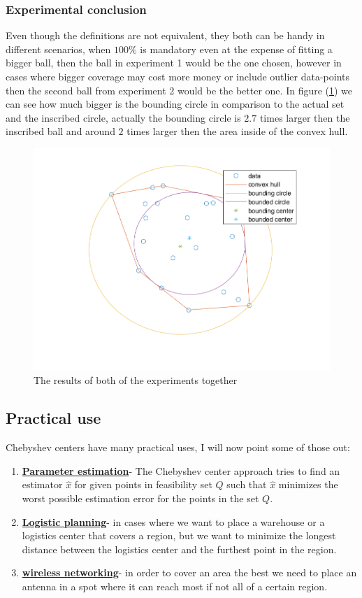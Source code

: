 \documentclass[]{article}
\newcommand{\Q}[0]{\textit{Q}}
\begin{document}
\subsubsection{Experimental conclusion}
Even though the definitions are not equivalent, they both can be handy in different scenarios, when $100\%$ is mandatory even at the expense of fitting a bigger ball, then the ball in experiment 1 would be the one chosen, however in cases where bigger coverage may cost more money or include outlier data-points then the second ball from experiment 2 would be the better one.
In figure (\ref{both}) we can see how much bigger is the bounding circle in comparison to the actual set and the inscribed circle, actually the bounding circle is $2.7$ times larger then the inscribed ball and around $2$ times larger then the area inside of the convex hull.

\begin{figure}[!h]
	\centering
	\includegraphics[width=\textwidth]{both}
	\caption{The results of both of the experiments together}
	\label{both}
\end{figure}

\subsection{Practical use}

Chebyshev centers have many practical uses, I will now point some of those out:
\begin{enumerate}
	\item \underline{\textbf{Parameter estimation}}- The Chebyshev center approach tries to find an estimator $\hat{x}$ for given points in feasibility set $\Q$ such that $\hat{x}$ minimizes the worst possible estimation error for the points in the set $\Q$.
	\item \underline{\textbf{Logistic planning}}- in cases where we want to place a warehouse or a logistics center that covers a region, but we want to minimize the longest distance between the logistics center and the furthest point in the region.
	\item \underline{\textbf{wireless networking}}- in order to cover an area the best we need to place an antenna in a spot where it can reach most if not all of a certain region.
\end{enumerate}
\end{document}

